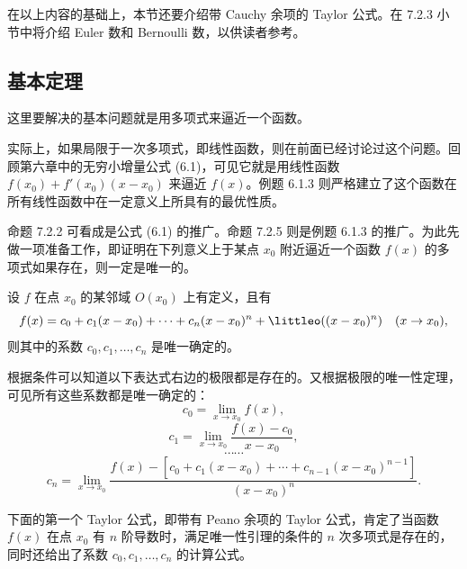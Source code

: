 在以上内容的基础上，本节还要介绍带 Cauchy 余项的 Taylor 公式。在 7.2.3 小节中将介绍 Euler 数和 Bernoulli 数，以供读者参考。

\subsection{基本定理}

这里要解决的基本问题就是用多项式来逼近一个函数。

实际上，如果局限于一次多项式，即线性函数，则在前面已经讨论过这个问题。回顾第六章中的无穷小增量公式 (6.1)，可见它就是用线性函数 $f(x_0)+f'(x_0)(x-x_0)$ 来逼近 $f(x)$。例题 6.1.3 则严格建立了这个函数在所有线性函数中在一定意义上所具有的最优性质。

命题 7.2.2 可看成是公式 (6.1) 的推广。命题 7.2.5 则是例题 6.1.3 的推广。为此先做一项准备工作，即证明在下列意义上于某点 $x_0$ 附近逼近一个函数 $f(x)$ 的多项式如果存在，则一定是唯一的。

\begin{xproposition}[7.2.1（唯一性引理）]
设 $f$ 在点 $x_0$ 的某邻域 $O(x_0)$ 上有定义，且有
\[
  f(x)=c_0+c_1(x-x_0)+\cdots+c_n(x-x_0)^n+\littleo((x-x_0)^n)\quad(x\to x_0),
\]
则其中的系数 $c_0,c_1,\ldots,c_n$ 是唯一确定的。
\end{xproposition}
\begin{xproof}
根据条件可以知道以下表达式右边的极限都是存在的。又根据极限的唯一性定理，可见所有这些系数都是唯一确定的：
\[
  c_0=\lim_{x\to x_0}f(x),
\]
\[
  c_1=\lim_{x\to x_0}\frac{f(x)-c_0}{x-x_0},
\]
\[
  \cdots\cdots
\]
\[
  c_n=\lim_{x\to x_0}
  \frac{f(x)-[c_0+c_1(x-x_0)+\cdots+c_{n-1}(x-x_0)^{n-1}]}{(x-x_0)^n}.
\]
\end{xproof}

下面的第一个 Taylor 公式，即带有 Peano 余项的 Taylor 公式，肯定了当函数 $f(x)$ 在点 $x_0$ 有 $n$ 阶导数时，满足唯一性引理的条件的 $n$ 次多项式是存在的，同时还给出了系数 $c_0,c_1,\ldots,c_n$ 的计算公式。

